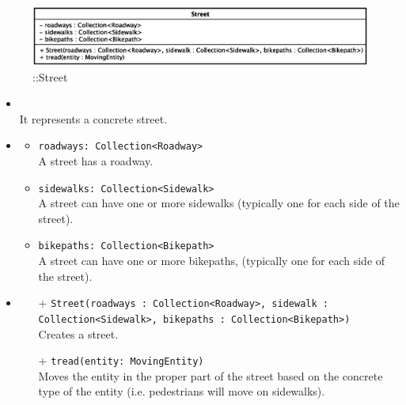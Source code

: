 \begin{figure}[h]
\centering
\includegraphics[scale=0.6,keepaspectratio]{images/solution/app/backend/street.eps}
\caption{\pReactiveComponent::Street}
\label{fig:sd-app-street}
\end{figure}
\FloatBarrier
\begin{itemize}
  \item \textbf{\descr} \\
    It represents a concrete street.
  \item \textbf{\attrs}
  \begin{itemize}
    \item \texttt{roadways: Collection<Roadway>} \\
A street has a roadway.
    \item \texttt{sidewalks: Collection<Sidewalk>} \\
A street can have one or more sidewalks (typically one for each side
of the street).
    \item \texttt{bikepaths: Collection<Bikepath>} \\
A street can have one or more bikepaths, (typically one for each side
of the street).
  \end{itemize}
  \item \textbf{\ops}
  \begin{itemize}
  \item[+] \texttt{Street(roadways : Collection<Roadway>, sidewalk : Collection<Sidewalk>, bikepaths : Collection<Bikepath>)} \\
    Creates a street.
    \item[+] \texttt{tread(entity: MovingEntity)} \\
Moves the entity in the proper part of the street based on the
concrete type of the entity (i.e. pedestrians will move on sidewalks).
  \end{itemize}
\end{itemize}
